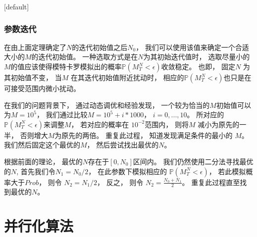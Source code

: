 \documentclass{beamer}
\makeatletter
\newenvironment{withoutheadline}{
  \setbeamertemplate{headline}[default]
  \def\beamer@entrycode{\vspace*{-\headheight}}
}{}
\makeatother
\begin{document}
\begin{withoutheadline}
\begin{frame}
\frametitle{参数迭代}
在由上面定理确定了$N$的迭代初始值之后$N_0$， 我们可以使用该值来确定一个合适大小的$M$的迭代初始值。
一种选取方式是在$N$为其初始迭代值时， 选取尽量小的$M$的值应该使得模特卡罗模拟出的概率$\mathbb{P}(M_T^N<\epsilon)$收敛稳定。
也即， 固定$N$ 为其初始值不变， 当$M$ 在其迭代初始值附近扰动时， 相应的$\mathbb{P}(M_T^N<\epsilon)$也只是在可接受范围内微小扰动。

在我们的问题背景下， 通过动态调优和经验发现， 一个较为恰当的$M$初始值可以为$M=10^5$， 我们通过比较$M=10^5+i*1000$， $i=0,...,10$。
所对应的$\mathbb{P}(M_T^N<\epsilon)$来调整$M$， 若对应的概率在 $10^{-2}$范围内， 则将$M$ 减小为原先的一半， 否则增大$M$为原先的两倍。
重复此过程， 知道发现满足条件的最小的 $M$。 我们然后固定这个最优的$M$， 然后尝试找出最优的$N$。

根据前面的理论， 最优的$N$存在于$[0, N_0]$区间内。 我们仍然使用二分法寻找最优的$N$, 首先我们令$N_1=N_0/2$， 在此参数下模拟相应的
$\mathbb{P}(M_T^N<\epsilon)$， 若此模拟概率大于$Prob$， 则令 $N_2=N_1/2$， 反之， 则令 $N_2=\frac{N_0+N_1}{2}$。
重复此过程直至找到最优的$N$。

\end{frame}
\end{withoutheadline}

\section{并行化算法} %
\label{sec:algorithm}
\end{document}
